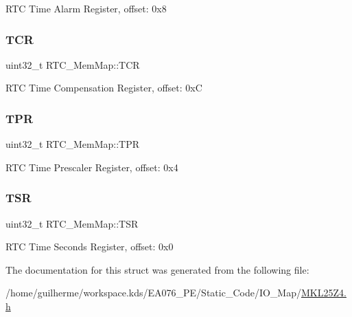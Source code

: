 R\+TC Time Alarm Register, offset\+: 0x8 \mbox{\label{struct_r_t_c___mem_map_ab816b0540497796070202cd2f5bc10ed}} 
\subsubsection{\texorpdfstring{T\+CR}{TCR}}
{\footnotesize\ttfamily uint32\+\_\+t R\+T\+C\+\_\+\+Mem\+Map\+::\+T\+CR}

R\+TC Time Compensation Register, offset\+: 0xC \mbox{\label{struct_r_t_c___mem_map_a32641b62d548255bdf2164b457a2aaeb}} 
\subsubsection{\texorpdfstring{T\+PR}{TPR}}
{\footnotesize\ttfamily uint32\+\_\+t R\+T\+C\+\_\+\+Mem\+Map\+::\+T\+PR}

R\+TC Time Prescaler Register, offset\+: 0x4 \mbox{\label{struct_r_t_c___mem_map_a4ca4d2878d99736cbff0e8b107a275f2}} 
\subsubsection{\texorpdfstring{T\+SR}{TSR}}
{\footnotesize\ttfamily uint32\+\_\+t R\+T\+C\+\_\+\+Mem\+Map\+::\+T\+SR}

R\+TC Time Seconds Register, offset\+: 0x0 

The documentation for this struct was generated from the following file\+:\begin{DoxyCompactItemize}
\item 
/home/guilherme/workspace.\+kds/\+E\+A076\+\_\+\+P\+E/\+Static\+\_\+\+Code/\+I\+O\+\_\+\+Map/\hyperlink{_m_k_l25_z4_8h}{M\+K\+L25\+Z4.\+h}\end{DoxyCompactItemize}
